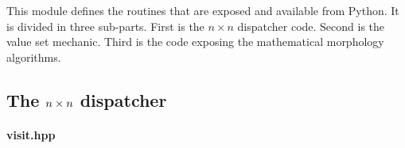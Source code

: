 This module defines the routines that are exposed and available from Python. It is divided in three sub-parts. First is
the \(n \times n\) dispatcher code. Second is the value set mechanic. Third is the code exposing the mathematical morphology
algorithms.

\subsection{The \(\protect n \times n\) dispatcher}
\label{appendix:static-dynamic-bridge.mm.nndispatcher}

\paragraph{visit.hpp}
\label{appendix:static-dynamic-bridge.mm.nndispatcher.visit.hpp}

